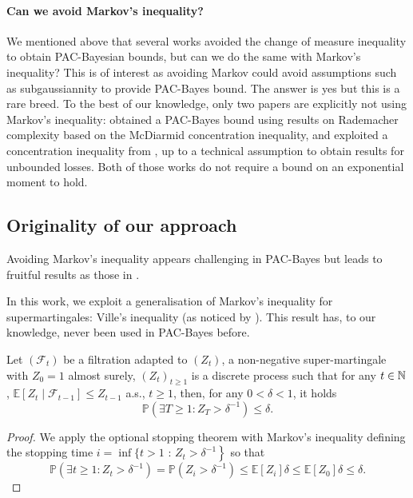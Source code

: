 \paragraph{Can we avoid Markov's inequality?}
We mentioned above that several works avoided the change of measure inequality to obtain PAC-Bayesian bounds, but can we do the same with Markov's inequality? This is of interest as avoiding Markov could avoid assumptions such as subgaussiannity to provide PAC-Bayes bound.
The answer is yes but this is a rare breed. To the best of our knowledge, only two papers are explicitly not using Markov's inequality: \citet{kakade2008complexity} obtained a PAC-Bayes bound using results on Rademacher complexity based on the McDiarmid concentration inequality, and \citet{kuzborskij2019efron} exploited a concentration inequality from \citet{delapena2009self}, up to a technical assumption to obtain results for unbounded losses. Both of those works do not require a bound on an exponential moment to hold.



\subsection{Originality of our approach}

Avoiding Markov's inequality appears challenging in PAC-Bayes but leads to fruitful results as those in \citet{kuzborskij2019efron}.

In this work, we exploit a generalisation of Markov's inequality for supermartingales: Ville's inequality (as noticed by \citealt{doob1939jean}). This result has, to our knowledge, never been used in PAC-Bayes before.

\begin{lemma}
\label{l: ville_ineq}
Let $\left(\mathcal{F}_{t}\right)$ be a filtration adapted to $\left(Z_{t}\right)$, a non-negative super-martingale with $Z_{0}=1$ almost surely, \ie $(Z_t)_{t\geq 1}$ is a discrete process such that for any $t\in\mathbb{N}$, $\mathbb{E}\left[Z_{t} \mid \mathcal{F}_{t-1}\right] \leq Z_{t-1}$ a.s., $t \geq 1$, then, for any $0<\delta<1$, it holds
$$
\mathbb{P}\left(\exists T \geq 1: Z_{T}>\delta^{-1}\right) \leq \delta.
$$
\end{lemma}

\begin{proof}
  We apply the optional stopping theorem \citep[][Thm 4.8.4]{durrett2019probability} with Markov's inequality defining the stopping time $i=\inf \{t>1$ : $\left.Z_{t}>\delta^{-1}\right\}$ so that
  $$
  \mathbb{P}\left(\exists t \geq 1: Z_{t}>\delta^{-1}\right)=\mathbb{P}\left(Z_{i}>\delta^{-1}\right) \leq \mathbb{E}\left[Z_{i}\right] \delta \leq \mathbb{E}\left[Z_{0}\right] \delta \leq \delta.
  $$
\end{proof}

